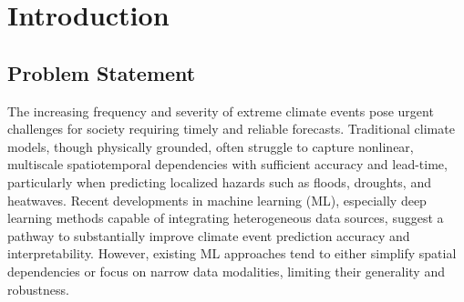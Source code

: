 \maketitle

\begin{abstract}
Accurate prediction of extreme climate events such as floods, droughts, and heatwaves remains a critical scientific challenge with profound societal implications. Advances in machine learning offer promising avenues to improve forecasting by leveraging large multimodal climate datasets—encompassing satellite imagery, reanalysis time series, and simulation outputs. This paper proposes a novel hybrid deep learning architecture combining Temporal Convolutional Networks (TCN) and Graph Neural Networks (GNN) to model complex spatiotemporal dependencies inherent in climate phenomena. Integrating diverse datasets in a unified trainable framework, our approach outperforms state-of-the-art baselines in both event classification and continuous variable prediction. Comprehensive ablation studies and interpretability analyses underscore the value of the hybrid architecture and multimodal fusion. Statistical significance tests and stress experiments demonstrate robustness under climate variability and data noise. The results indicate that such hybrid ML models can substantially enhance early warning capabilities, thereby contributing to more effective climate adaptation strategies.
\end{abstract}

\section{Introduction}

\subsection{Problem Statement}

The increasing frequency and severity of extreme climate events pose urgent challenges for society requiring timely and reliable forecasts. Traditional climate models, though physically grounded, often struggle to capture nonlinear, multiscale spatiotemporal dependencies with sufficient accuracy and lead-time, particularly when predicting localized hazards such as floods, droughts, and heatwaves. Recent developments in machine learning (ML), especially deep learning methods capable of integrating heterogeneous data sources, suggest a pathway to substantially improve climate event prediction accuracy and interpretability. However, existing ML approaches tend to either simplify spatial dependencies or focus on narrow data modalities, limiting their generality and robustness.

